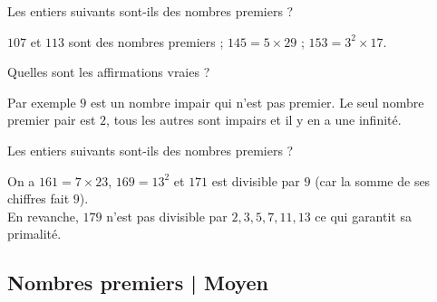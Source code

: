 \begin{question}
    Les entiers suivants sont-ils des nombres premiers ?
    \begin{answers} 
    \end{answers}
    \begin{explanations} 
        $107$ et $113$ sont des nombres premiers ;
        $145 = 5 \times 29$ ;  $153 = 3^2 \times 17$.
    \end{explanations}
\end{question}


\begin{question}
    Quelles sont les affirmations vraies ?
    \begin{answers} 
    \end{answers}
    \begin{explanations}
    Par exemple $9$ est un nombre impair qui n'est pas premier. 
    Le seul nombre premier pair est $2$, tous les autres sont impairs et il y en a une infinité.     
    \end{explanations}
\end{question}


\begin{question}
 Les entiers suivants sont-ils des nombres premiers ?
    \begin{answers} 
    \end{answers}
    \begin{explanations} 
    On a $161 = 7 \times 23$, $169 = 13^2$ et $171$ est divisible par $9$ (car la somme de ses chiffres fait $9$).\\
    En revanche, $179$ n'est pas divisible par $2,3, 5, 7, 11, 13$ ce qui garantit sa primalité. 
    \end{explanations}
\end{question}


\subsection{Nombres premiers | Moyen}


